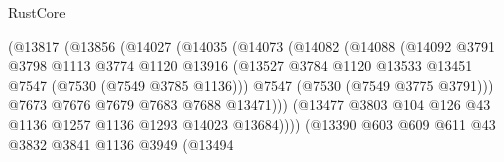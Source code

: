 \begin{lexlean}{RustCore}
\begin{coremodule}
                                  (@13817
                                    (@13856
                                      (@14027
                                        (@14035
                                          (@14073
                                            (@14082
                                              (@14088
                                                (@14092
                                                  @3791
                                                  @3798
                                                  @1113
                                                  @3774
                                                  @1120
                                                  @13916
                                                  (@13527
                                                    @3784
                                                    @1120
                                                    @13533
                                                    @13451
                                                    @7547
                                                    (@7530 (@7549 @3785 @1136)))
                                                  @7547
                                                  (@7530 (@7549 @3775 @3791)))
                                                @7673
                                                @7676
                                                @7679
                                                @7683
                                                @7688
                                                @13471)))
                                          (@13477
                                            @3803
                                            @104
                                            @126
                                            @43
                                            @1136
                                            @1257
                                            @1136
                                            @1293
                                            @14023
                                            @13684))))
                                    (@13390
                                      @603
                                      @609
                                      @611
                                      @43
                                      @3832
                                      @3841
                                      @1136
                                      @3949
                                      (@13494

\end{coremodule}
\end{lexlean}
